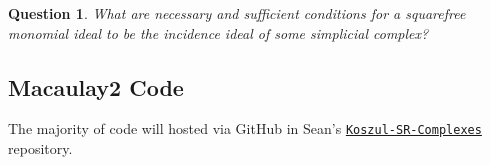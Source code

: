 \documentclass[12pt,a4paper]{article}
\newtheorem{question}[theorem]{Question}
\theoremstyle{definition}
\numberwithin{equation}{section}
\begin{document}
\begin{question}{\cite[Question 61]{holleben_weak_2024}}
    What are necessary and sufficient conditions for a squarefree monomial ideal to be the \emph{incidence ideal} of some simplicial complex?
\end{question}


\subsection{Macaulay2 Code}
The majority of code will hosted via GitHub in Sean's \href{https://github.com/seangrate/Koszul-SR-Complexes/blob/main/koszul_tails.m2}{\tt Koszul-SR-Complexes} repository.


\newpage


\end{document}
